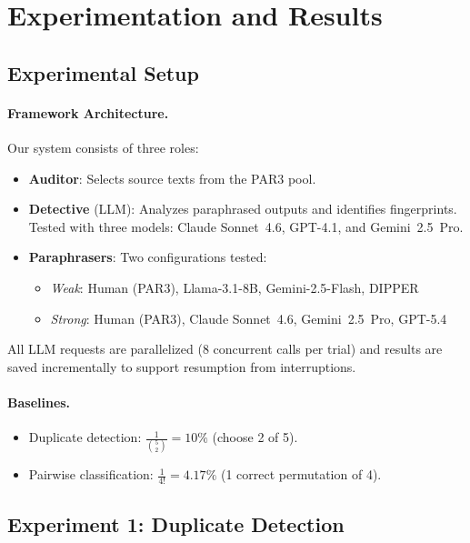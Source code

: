 \documentclass[sigconf,nonacm]{acmart}
\begin{document}
\section{Experimentation and Results}

\subsection{Experimental Setup}

\paragraph{Framework Architecture.}
Our system consists of three roles:
\begin{itemize}
    \item \textbf{Auditor}: Selects source texts from the PAR3 pool.
    \item \textbf{Detective} (LLM): Analyzes paraphrased outputs and identifies fingerprints. Tested with three models: Claude Sonnet~4.6, GPT-4.1, and Gemini~2.5~Pro.
    \item \textbf{Paraphrasers}: Two configurations tested:
    \begin{itemize}
        \item \emph{Weak}: Human (PAR3), Llama-3.1-8B, Gemini-2.5-Flash, DIPPER
        \item \emph{Strong}: Human (PAR3), Claude Sonnet~4.6, Gemini~2.5~Pro, GPT-5.4
    \end{itemize}
\end{itemize}

All LLM requests are parallelized (8 concurrent calls per trial) and results are saved incrementally to support resumption from interruptions.

\paragraph{Baselines.}
\begin{itemize}
    \item Duplicate detection: $\frac{1}{\binom{5}{2}} = 10\%$ (choose 2 of 5).
    \item Pairwise classification: $\frac{1}{4!} = 4.17\%$ (1 correct permutation of 4).
\end{itemize}

\subsection{Experiment 1: Duplicate Detection}
\end{document}
